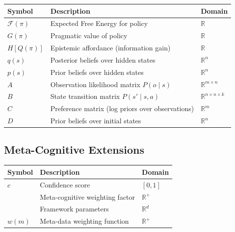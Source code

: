 \documentclass[
]{article}
\newcounter{none} %
\begin{document}
{\def\LTcaptype{none} %
\begin{longtable}[]{@{}
  >{\raggedright\arraybackslash}p{}
  >{\raggedright\arraybackslash}p{}
  >{\raggedright\arraybackslash}p{}@{}}
\toprule\noalign{}
\begin{minipage}[b]{\linewidth}\raggedright
Symbol
\end{minipage} & \begin{minipage}[b]{\linewidth}\raggedright
Description
\end{minipage} & \begin{minipage}[b]{\linewidth}\raggedright
Domain
\end{minipage} \\
\midrule\noalign{}
\endhead
\bottomrule\noalign{}
\endlastfoot
\(\mathcal{F}(\pi)\) & Expected Free Energy for policy \(\pi) &
\(\mathbb{R}\) \\
\(G(\pi)\) & Pragmatic value of policy \(\pi) & \(\mathbb{R}\) \\
\(H[Q(\pi)]\) & Epistemic affordance (information gain) &
\(\mathbb{R}\) \\
\(q(s)\) & Posterior beliefs over hidden states & \(\mathbb{R}^n\) \\
\(p(s)\) & Prior beliefs over hidden states & \(\mathbb{R}^n\) \\
\(A\) & Observation likelihood matrix \(P(o \mid s)\) &
\(\mathbb{R}^{m \times n}\) \\
\(B\) & State transition matrix \(P(s' \mid s, a)\) &
\(\mathbb{R}^{n \times n \times k}\) \\
\(C\) & Preference matrix (log priors over observations) &
\(\mathbb{R}^m\) \\
\(D\) & Prior beliefs over initial states & \(\mathbb{R}^n\) \\
\end{longtable}
}

\subsection{Meta-Cognitive Extensions}\label{meta-cognitive-extensions}

{\def\LTcaptype{none} %
\begin{longtable}[]{@{}lll@{}}
\toprule\noalign{}
Symbol & Description & Domain \\
\midrule\noalign{}
\endhead
\bottomrule\noalign{}
\endlastfoot
\(c\) & Confidence score & \([0,1]\) \\
\(\lambda) & Meta-cognitive weighting factor & \(\mathbb{R}^+\) \\
\(\Theta) & Framework parameters & \(\mathbb{R}^d\) \\
\(w(m)\) & Meta-data weighting function & \(\mathbb{R}^+\) \\
\end{longtable}
}
\end{document}
